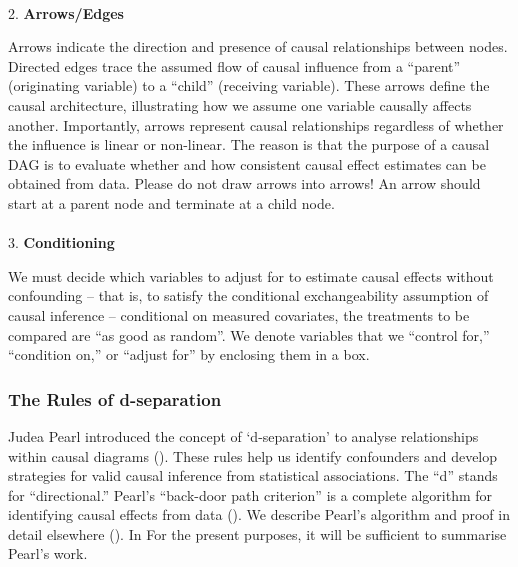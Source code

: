 \documentclass[
  singlecolumn]{article}
\makeatletter
\let\oldparagraph\paragraph
\renewcommand{\paragraph}{
    \@ifstar
      \xxxParagraphStar
      \xxxParagraphNoStar
  }
\newcommand{\xxxParagraphStar}[1]{\oldparagraph*{#1}\mbox{}}
\newcommand{\xxxParagraphNoStar}[1]{\oldparagraph{#1}\mbox{}}
\makeatother
\begin{document}
\paragraph{\texorpdfstring{2.
\textbf{Arrows/Edges}}{2. Arrows/Edges}}\label{arrowsedges}

Arrows indicate the direction and presence of causal relationships
between nodes. Directed edges trace the assumed flow of causal influence
from a ``parent'' (originating variable) to a ``child'' (receiving
variable). These arrows define the causal architecture, illustrating how
we assume one variable causally affects another. Importantly, arrows
represent causal relationships regardless of whether the influence is
linear or non-linear. The reason is that the purpose of a causal DAG is
to evaluate whether and how consistent causal effect estimates can be
obtained from data. Please do not draw arrows into arrows! An arrow
should start at a parent node and terminate at a child node.

\paragraph{\texorpdfstring{3.
\textbf{Conditioning}}{3. Conditioning}}\label{conditioning}

We must decide which variables to adjust for to estimate causal effects
without confounding -- that is, to satisfy the conditional
exchangeability assumption of causal inference -- conditional on
measured covariates, the treatments to be compared are ``as good as
random''. We denote variables that we ``control for,'' ``condition on,''
or ``adjust for'' by enclosing them in a box.

\subsubsection{The Rules of
d-separation}\label{the-rules-of-d-separation}

Judea Pearl introduced the concept of `d-separation' to analyse
relationships within causal diagrams (). These rules help us identify confounders and develop strategies
for valid causal inference from statistical associations. The ``d''
stands for ``directional.'' Pearl's ``back-door path criterion'' is a
complete algorithm for identifying causal effects from data
(). We describe Pearl's algorithm
and proof in detail elsewhere (). In For the present purposes, it will be sufficient to summarise
Pearl's work.
\end{document}
